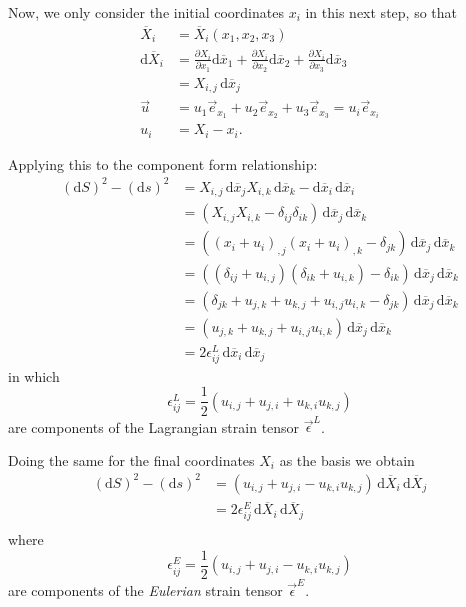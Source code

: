 Now, we only consider the initial coordinates $x_i$ in this next step, so that
\begin{align*}
  \overline{X}_i &= \overline{X}_i (x_1, x_2, x_3) \\
  \mathrm{d}\overline{X}_i &= \frac{\partial X_i}{\partial x_1} \mathrm{d}\overline{x}_1 + \frac{\partial X_i}{\partial x_2} \mathrm{d}\overline{x}_2 + \frac{\partial X_i}{\partial x_3} \mathrm{d}\overline{x}_3 \\
  &= X_{i,j} \, \mathrm{d}\overline{x}_j \\
  \Vec{u} &= u_1 \Vec{e}_{x_1} + u_2 \Vec{e}_{x_2} + u_3 \Vec{e}_{x_3} = u_i \Vec{e}_{x_i} \\
  u_i &= X_i - x_i
.\end{align*}

Applying this to the component form relationship:
\begin{align*}
  \left( \mathrm{d}S \right)^2 - \left( \mathrm{d}s \right)^2 &= X_{i,j} \, \mathrm{d}\overline{x}_j X_{i,k} \, \mathrm{d}\overline{x}_k - \mathrm{d}\overline{x}_i \, \mathrm{d}\overline{x}_i \\
  &= \left( X_{i,j} X_{i,k} - \delta_{ij} \delta_{ik} \right) \, \mathrm{d}\overline{x}_j \, \mathrm{d}\overline{x}_k \\
  &= \left( \left( x_i + u_i \right)_{,j} \left( x_i + u_i \right)_{,k} - \delta_{jk} \right) \, \mathrm{d}\overline{x}_j \, \mathrm{d}\overline{x}_k \\
  &= \left( \left( \delta_{ij} + u_{i,j} \right) \left( \delta_{ik} + u_{i,k} \right) - \delta_{ik} \right) \, \mathrm{d}\overline{x}_j \, \mathrm{d}\overline{x}_k \\
  &= \left( \delta_{jk} + u_{j,k} + u_{k,j} + u_{i,j} u_{i,k} - \delta_{jk} \right) \, \mathrm{d}\overline{x}_{j} \, \mathrm{d}\overline{x}_k \\
  &= \left( u_{j,k} + u_{k,j} + u_{i,j} u_{i,k} \right) \, \mathrm{d}\overline{x}_j \, \mathrm{d}\overline{x}_k \\
  &= 2 \epsilon^{L}_{ij} \, \mathrm{d}\overline{x}_i \, \mathrm{d}\overline{x}_j
\end{align*}
in which
\begin{equation*}
  \epsilon_{ij}^{L} = \frac{1}{2} \left( u_{i,j} + u_{j,i} + u_{k,i} u_{k,j} \right)
\end{equation*}
are components of the Lagrangian strain tensor $\Vec{\epsilon}^{L}$.

Doing the same for the final coordinates $X_i$ as the basis we obtain
\begin{align*}
  \left( \mathrm{d}S \right)^2 - \left( \mathrm{d}s \right)^2 &= \left( u_{i,j} + u_{j,i} - u_{k,i} u_{k,j} \right) \, \mathrm{d}\overline{X}_i \, \mathrm{d}\overline{X}_j \\
  &= 2 \epsilon_{ij}^{E} \, \mathrm{d}\overline{X}_i \, \mathrm{d}\overline{X}_j \\
\end{align*}
where
\begin{equation*}
  \epsilon_{ij}^{E} = \frac{1}{2} \left( u_{i,j} + u_{j,i} - u_{k,i} u_{k,j} \right)
\end{equation*}
are components of the \textit{Eulerian} strain tensor $\Vec{\epsilon}^{E}$.

